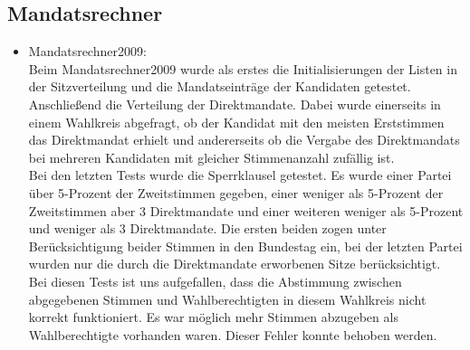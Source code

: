 \documentclass[12pt,a4paper,titlepage]{article}
\begin{document}
\subsection{Mandatsrechner}
\begin{itemize}
\item Mandatsrechner2009:\\
Beim Mandatsrechner2009 wurde als erstes die Initialisierungen der Listen in der Sitzverteilung und die Mandatseinträge der Kandidaten getestet.\\
Anschließend die Verteilung der Direktmandate. Dabei wurde einerseits in einem Wahlkreis abgefragt, ob der Kandidat mit den meisten Erststimmen das Direktmandat erhielt und andererseits ob die Vergabe des Direktmandats bei mehreren Kandidaten mit gleicher Stimmenanzahl zufällig ist.\\
Bei den letzten Tests wurde die Sperrklausel getestet. Es wurde einer Partei über 5-Prozent der Zweitstimmen gegeben, einer  weniger als 5-Prozent der Zweitstimmen aber 3 Direktmandate und einer weiteren weniger als 5-Prozent und weniger als 3 Direktmandate. Die ersten beiden zogen unter Berücksichtigung beider Stimmen in den Bundestag ein, bei der letzten Partei wurden nur die durch die Direktmandate erworbenen Sitze berücksichtigt. \\
Bei diesen Tests ist uns aufgefallen, dass die Abstimmung zwischen abgegebenen Stimmen und Wahlberechtigten in diesem Wahlkreis nicht korrekt funktioniert. Es war möglich mehr Stimmen abzugeben als Wahlberechtigte vorhanden waren. Dieser Fehler konnte behoben werden.\\


\end{itemize}
\end{document}
